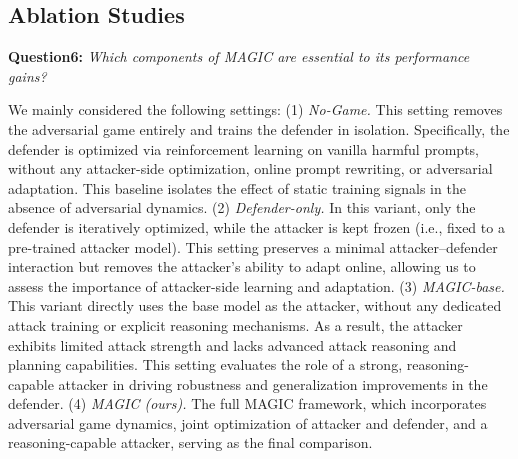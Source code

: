 \documentclass[11pt, letterpaper]{template}
\theoremstyle{plain}
\theoremstyle{definition}
\theoremstyle{remark}
\begin{document}
\subsection{Ablation Studies}
\begin{rqbox}
    \textbf{Question6:} \textit{Which components of MAGIC are essential to its performance gains?} 
\end{rqbox}
We mainly considered the following settings:
(1) \textit{No-Game.} This setting removes the adversarial game entirely and trains the defender in isolation. Specifically, the defender is optimized via reinforcement learning on vanilla harmful prompts, without any attacker-side optimization, online prompt rewriting, or adversarial adaptation. This baseline isolates the effect of static training signals in the absence of adversarial dynamics.
(2) \textit{Defender-only.} In this variant, only the defender is iteratively optimized, while the attacker is kept frozen (i.e., fixed to a pre-trained attacker model). This setting preserves a minimal attacker–defender interaction but removes the attacker’s ability to adapt online, allowing us to assess the importance of attacker-side learning and adaptation.
(3) \textit{MAGIC-base.} This variant directly uses the base model as the attacker, without any dedicated attack training or explicit reasoning mechanisms. As a result, the attacker exhibits limited attack strength and lacks advanced attack reasoning and planning capabilities. This setting evaluates the role of a strong, reasoning-capable attacker in driving robustness and generalization improvements in the defender.
(4) \textit{MAGIC (ours).} The full MAGIC framework, which incorporates adversarial game dynamics, joint optimization of attacker and defender, and a reasoning-capable attacker, serving as the final comparison.
\end{document}
